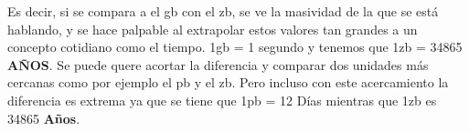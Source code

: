 Es decir, si se compara a el \acrlong{gb} con el \acrlong{zb}, se ve la
masividad de la que se está hablando, y se hace palpable al extrapolar estos
valores tan grandes a un concepto cotidiano como el tiempo. 1\acrshort{gb} = 1
segundo y tenemos que 1\acrshort{zb} = 34865 {\bf AÑOS}. Se puede quere acortar
la diferencia y comparar dos unidades más cercanas como por ejemplo el
\acrlong{pb} y el \acrlong{zb}. Pero incluso con este acercamiento la
diferencia es extrema ya que se tiene que 1\acrshort{pb} = 12 Días mientras que
1\acrshort{zb} es 34865 {\bf Años}.
